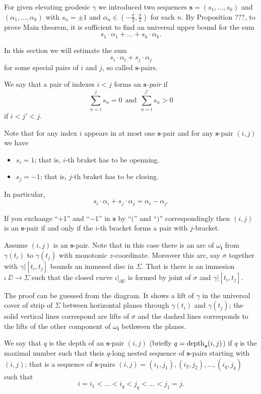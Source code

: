 \documentclass[a4paper,10pt]{amsart}
\begin{document}
For given elevating geodesic $\gamma$ 
we introduced two sequences 
$\bm{s}=(s_1,\dots,s_k)$
and $(\alpha_1,\dots,\alpha_k)$ 
with $s_n=\pm1$ and $\alpha_n\in(-\tfrac\pi2,\tfrac\pi2)$ for each $n$.
By Proposition ???, to prove Main theorem,
it is sufficient to find an universal upper bound for the sum
\[s_1\cdot\alpha_1+\dots+s_k\cdot\alpha_k.\]

In this section we will estimate the sum
\[s_i\cdot\alpha_i+s_j\cdot\alpha_j\] 
for some special pairs of $i$ and $j$, so called $\bm{s}$-pairs.

We say that a pair of indexes $i<j$
forms an \emph{$\bm{s}$-pair} 
if 
\[
\sum_{n=i}^js_n=0\ \ 
\text{and}\ \ 
\sum_{n=i}^{j'}s_n>0
\]
if $i<j'<j$.

Note that for any index $i$ appears in at most one $\bm{s}$-pair and 
for any $\bm{s}$-pair $(i,j)$ we have
\begin{itemize}
\item $s_i=1$; that is, $i$-th braket has to be openning.
 \item $s_j=-1$; that is, $j$-th braket has to be closing.
\end{itemize}
In particular,
\[s_i\cdot\alpha_i+s_j\cdot\alpha_j=\alpha_i-\alpha_j.\]

If you exchange ``$+1$'' and ``$-1$'' in $\bm{s}$ by ``$($'' and ``$)$'' correspondingly then $(i,j)$ is an $\bm{s}$-pair
if and only if the $i$-th bracket forms a pair with $j$-bracket.

\parbf{Embedded disc interpretation.}
Assume $(i,j)$ is an $\bm{s}$-pair.
Note that in this case there is an arc of $\omega_{\bm{i}}$
from $\gamma(t_i)$ to $\gamma(t_j)$
with monotonic $z$-coordinate.
Moreover this arc, say $\sigma$ together with $\gamma|{[t_i,t_j]}$ bounds an immesed disc in $\Sigma$.
That is there is an immesion $\iota\:\DD\to\Sigma$ 
such that the closed curve $\iota|_{\partial \DD}$ is formed by joint of $\sigma$ and $\gamma|{[t_i,t_j]}$.

The proof can be guessed from the diagram.
It shows a lift of $\gamma$ in the universal cover of strip of $\Sigma$ between horizontal planes through $\gamma(t_i)$ and $\gamma(t_j)$;
the solid vertical lines correspond are lifts of $\sigma$ and the dashed lines corresponds to the lifts of the other component of $\omega_{\bm{i}}$ bethween the planes.

We say that $q$ is the depth of an $\bm{s}$-pair $(i,j)$
(briefly $q=\mathop{\rm depth}\nolimits_{\bm{s}}(i,j)$) 
if $q$ is the maximal number such that theis $q$-long nested sequence of $\bm{s}$-pairs starting with $(i,j)$; 
that is a sequence of $\bm{s}$-pairs
$(i,j)=(i_1,j_1),(i_2,j_2),\dots,(i_q,j_q)$ such that
\[i=i_1<\dots<i_q<j_q<\dots<j_1=j.\]
\end{document}
